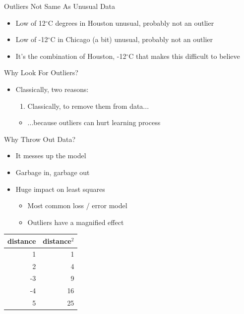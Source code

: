\documentclass[aspectratio=169]{beamer}
\begin{document}
\begin{frame}{Outliers Not Same As Unusual Data}

\begin{itemize}
	\item Low of 12$^{\circ}$C degrees in Houston unusual, probably not an outlier
	\item Low of -12$^{\circ}$C in Chicago (a bit) unusual, probably not an outlier
	\item It's the combination of Houston, -12$^{\circ}$C that makes this difficult to believe
\end{itemize}

\end{frame}
\begin{frame}{Why Look For Outliers?}

\begin{itemize}
	\item Classically, two reasons:
        \begin{enumerate}
		\item Classically, to remove them from data...
        \end{enumerate}
        \begin{itemize}
		\item ...because outliers can hurt learning process
        \end{itemize}
\end{itemize}

\end{frame}
\begin{frame}{Why Throw Out Data?}

\begin{itemize}
        \item It messes up the model
        \item Garbage in, garbage out
        \item Huge impact on least squares
        \begin{itemize}
        	\item Most common loss / error model
	\item Outliers have a magnified effect
        \end{itemize}
\end{itemize}
\begin {table}[!htbp]
\begin{center}
\begin{tabular}{|r|r|}
\hline
distance & distance$^2$ \\ \hline
1 & 1 \\ \hline
2 & 4  \\ \hline
-3 & 9 \\ \hline
-4 & 16 \\ \hline
5 & 25  \\ \hline
\end{tabular}
\end{center}
\end{table}
\end{frame}
\end{document}
